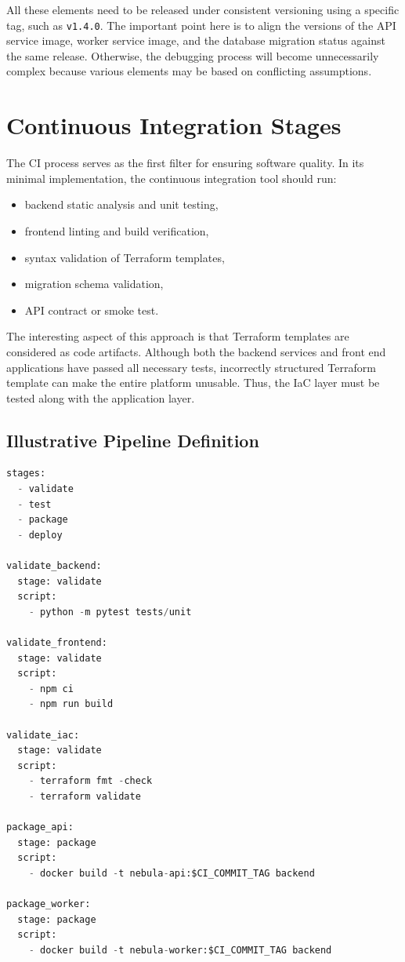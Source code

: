 All these elements need to be released under consistent versioning using a specific tag, such as \texttt{v1.4.0}. The important point here is to align the versions of the API service image, worker service image, and the database migration status against the same release. Otherwise, the debugging process will become unnecessarily complex because various elements may be based on conflicting assumptions.

\section{Continuous Integration Stages}
The CI process serves as the first filter for ensuring software quality. In its minimal implementation, the continuous integration tool should run:

\begin{itemize}
    \item backend static analysis and unit testing,
    \item frontend linting and build verification,
    \item syntax validation of Terraform templates,
    \item migration schema validation,
    \item API contract or smoke test.
\end{itemize}


The interesting aspect of this approach is that Terraform templates are considered as code artifacts. Although both the backend services and front end applications have passed all necessary tests, incorrectly structured Terraform template can make the entire platform unusable. Thus, the IaC layer must be tested along with the application layer.

\subsection{Illustrative Pipeline Definition}
\begin{lstlisting}[language=Python, caption=Representative CI Pipeline Skeleton]
stages:
  - validate
  - test
  - package
  - deploy

validate_backend:
  stage: validate
  script:
    - python -m pytest tests/unit

validate_frontend:
  stage: validate
  script:
    - npm ci
    - npm run build

validate_iac:
  stage: validate
  script:
    - terraform fmt -check
    - terraform validate

package_api:
  stage: package
  script:
    - docker build -t nebula-api:$CI_COMMIT_TAG backend

package_worker:
  stage: package
  script:
    - docker build -t nebula-worker:$CI_COMMIT_TAG backend
\end{lstlisting}


